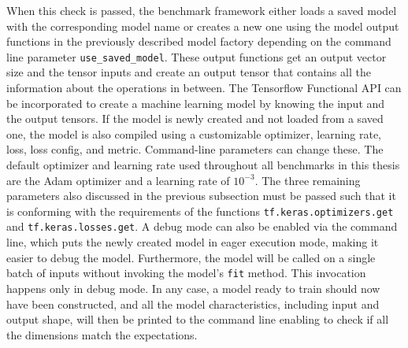 \documentclass[draft,final]{vutinfth} %
\begin{document}
    When this check is passed, the benchmark framework either loads a saved model with the corresponding model name or creates a new one using the model output functions in the previously described model factory depending on the command line parameter \texttt{use\_saved\_model}.
    These output functions get an output vector size and the tensor inputs and create an output tensor that contains all the information about the operations in between.
    The Tensorflow \cite{Tensorflow} Functional API can be incorporated to create a machine learning model by knowing the input and the output tensors.
    If the model is newly created and not loaded from a saved one, the model is also compiled using a customizable optimizer, learning rate, loss, loss config, and metric.
    Command-line parameters can change these.
    The default optimizer and learning rate used throughout all benchmarks in this thesis are the Adam optimizer \cite{Adam} and a learning rate of $10^{-3}$.
    The three remaining parameters also discussed in the previous subsection must be passed such that it is conforming with the requirements of the functions \texttt{tf.keras.optimizers.get} and \texttt{tf.keras.losses.get}.
    A debug mode can also be enabled via the command line, which puts the newly created model in eager execution mode, making it easier to debug the model. Furthermore, the model will be called on a single batch of inputs without invoking the model's \texttt{fit} method. This invocation happens only in debug mode.
    In any case, a model ready to train should now have been constructed, and all the model characteristics, including input and output shape, will then be printed to the command line enabling to check if all the dimensions match the expectations.
\end{document}

